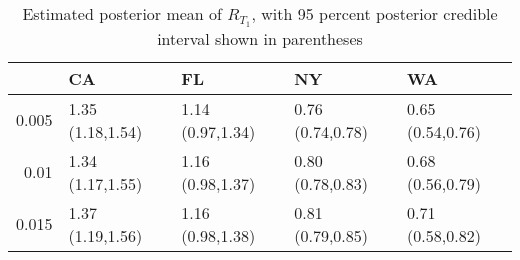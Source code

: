 \begin{table}[ht]
\centering
\begingroup\footnotesize
\begin{tabular}{rllll}
  \hline
 & CA & FL & NY & WA \\ 
  \hline
0.005 & 1.35 (1.18,1.54) & 1.14 (0.97,1.34) & 0.76 (0.74,0.78) & 0.65 (0.54,0.76) \\ 
  0.01 & 1.34 (1.17,1.55) & 1.16 (0.98,1.37) & 0.80 (0.78,0.83) & 0.68 (0.56,0.79) \\ 
  0.015 & 1.37 (1.19,1.56) & 1.16 (0.98,1.38) & 0.81 (0.79,0.85) & 0.71 (0.58,0.82) \\ 
   \hline
\end{tabular}
\endgroup
\caption{Estimated posterior mean of $R_{T_1}$, with 95 percent posterior credible interval shown in parentheses 
             \label{tab:RT1}} 
\end{table}
